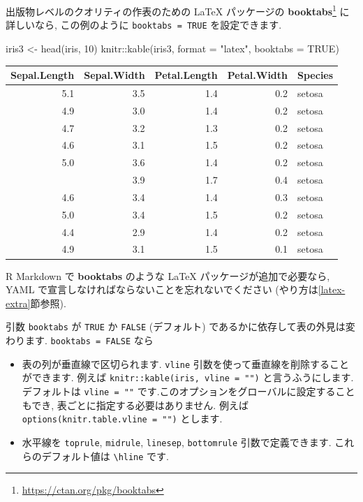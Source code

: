 \documentclass[
  11pt,
]{bxjsreport}
\newenvironment{Shaded}{\begin{snugshade}}{\end{snugshade}}
\newcommand{\AttributeTok}[1]{\textcolor[rgb]{0.77,0.63,0.00}{#1}}
\newcommand{\ConstantTok}[1]{\textcolor[rgb]{0.00,0.00,0.00}{#1}}
\newcommand{\DecValTok}[1]{\textcolor[rgb]{0.00,0.00,0.81}{#1}}
\newcommand{\FunctionTok}[1]{\textcolor[rgb]{0.00,0.00,0.00}{#1}}
\newcommand{\NormalTok}[1]{#1}
\newcommand{\OtherTok}[1]{\textcolor[rgb]{0.56,0.35,0.01}{#1}}
\newcommand{\SpecialCharTok}[1]{\textcolor[rgb]{0.00,0.00,0.00}{#1}}
\newcommand{\StringTok}[1]{\textcolor[rgb]{0.31,0.60,0.02}{#1}}
\providecommand{\tightlist}{%
  \setlength{\itemsep}{0pt}\setlength{\parskip}{0pt}}
\renewcommand{\href}[2]{#2\footnote{\url{#1}}}
\begin{document}
出版物レベルのクオリティの作表のための LaTeX パッケージの \href{https://ctan.org/pkg/booktabs}{\textbf{booktabs}} に詳しいなら, この例のように \texttt{booktabs = TRUE} を設定できます.

\begin{Shaded}
\begin{Highlighting}[numbers=left,,]
\NormalTok{iris3 }\OtherTok{\textless{}{-}} \FunctionTok{head}\NormalTok{(iris, }\DecValTok{10}\NormalTok{)}
\NormalTok{knitr}\SpecialCharTok{::}\FunctionTok{kable}\NormalTok{(iris3, }\AttributeTok{format =} \StringTok{"latex"}\NormalTok{, }\AttributeTok{booktabs =} \ConstantTok{TRUE}\NormalTok{)}
\end{Highlighting}
\end{Shaded}

\begin{tabular}{rrrrl}
\toprule
Sepal.Length & Sepal.Width & Petal.Length & Petal.Width & Species\\
\midrule
5.1 & 3.5 & 1.4 & 0.2 & setosa\\
4.9 & 3.0 & 1.4 & 0.2 & setosa\\
4.7 & 3.2 & 1.3 & 0.2 & setosa\\
4.6 & 3.1 & 1.5 & 0.2 & setosa\\
5.0 & 3.6 & 1.4 & 0.2 & setosa\\
\addlinespace
5.4 & 3.9 & 1.7 & 0.4 & setosa\\
4.6 & 3.4 & 1.4 & 0.3 & setosa\\
5.0 & 3.4 & 1.5 & 0.2 & setosa\\
4.4 & 2.9 & 1.4 & 0.2 & setosa\\
4.9 & 3.1 & 1.5 & 0.1 & setosa\\
\bottomrule
\end{tabular}

R Markdown で \textbf{booktabs} のような LaTeX パッケージが追加で必要なら, YAML で宣言しなければならないことを忘れないでください (やり方は\ref{latex-extra}節参照).

引数 \texttt{booktabs} が \texttt{TRUE} か \texttt{FALSE} (デフォルト) であるかに依存して表の外見は変わります. \texttt{booktabs = FALSE} なら

\begin{itemize}
\tightlist
\item
  表の列が垂直線で区切られます. \texttt{vline} 引数を使って垂直線を削除することができます. 例えば \texttt{knitr::kable(iris, vline = "")} と言うふうにします. デフォルトは \texttt{vline = "\textbar{}"} です.このオプションをグローバルに設定することもでき, 表ごとに指定する必要はありません. 例えば \texttt{options(knitr.table.vline = "")} とします.
\item
  水平線を \texttt{toprule}, \texttt{midrule}, \texttt{linesep}, \texttt{bottomrule} 引数で定義できます. これらのデフォルト値は \texttt{\textbackslash{}hline} です.
\end{itemize}
\end{document}
